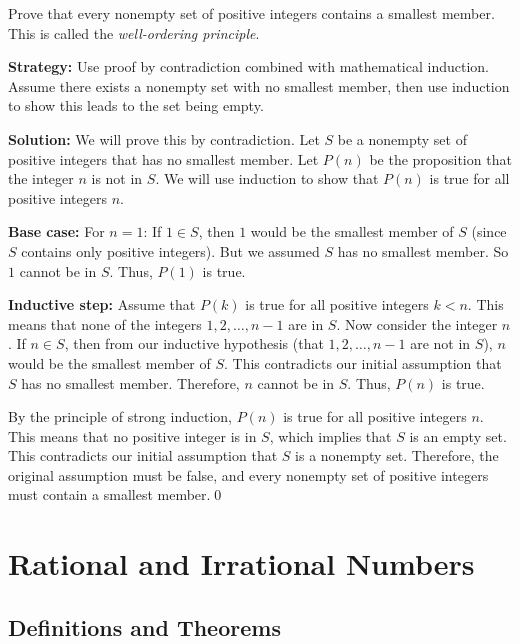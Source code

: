 \begin{problembox}
\begin{problemstatement}
Prove that every nonempty set of positive integers contains a smallest member. This is called the \textit{well-ordering principle}.
\end{problemstatement}
\end{problembox}

\noindent\textbf{Strategy:} Use proof by contradiction combined with mathematical induction. Assume there exists a nonempty set with no smallest member, then use induction to show this leads to the set being empty.

\bigskip\noindent\textbf{Solution:}
We will prove this by contradiction.
Let $S$ be a nonempty set of positive integers that has no smallest member.
Let $P(n)$ be the proposition that the integer $n$ is not in $S$. We will use induction to show that $P(n)$ is true for all positive integers $n$.

\textbf{Base case:}
For $n=1$: If $1 \in S$, then $1$ would be the smallest member of $S$ (since $S$ contains only positive integers). But we assumed $S$ has no smallest member. So $1$ cannot be in $S$. Thus, $P(1)$ is true.

\textbf{Inductive step:}
Assume that $P(k)$ is true for all positive integers $k < n$. This means that none of the integers $1, 2, \dots, n-1$ are in $S$.
Now consider the integer $n$. If $n \in S$, then from our inductive hypothesis (that $1, 2, \dots, n-1$ are not in $S$), $n$ would be the smallest member of $S$.
This contradicts our initial assumption that $S$ has no smallest member.
Therefore, $n$ cannot be in $S$. Thus, $P(n)$ is true.

By the principle of strong induction, $P(n)$ is true for all positive integers $n$. This means that no positive integer is in $S$, which implies that $S$ is an empty set.
This contradicts our initial assumption that $S$ is a nonempty set.
Therefore, the original assumption must be false, and every nonempty set of positive integers must contain a smallest member.\qed

\section{Rational and Irrational Numbers}
\subsection*{Definitions and Theorems}


